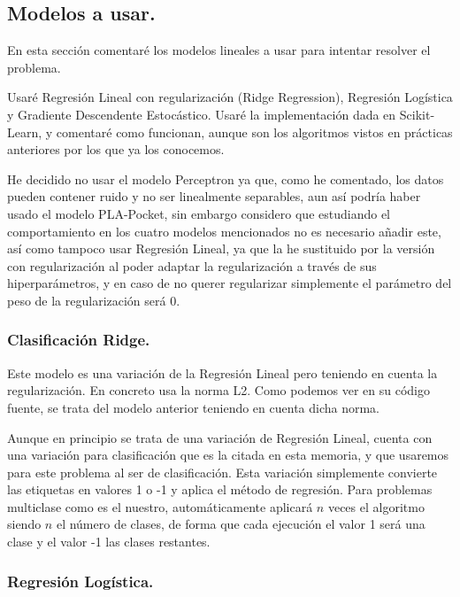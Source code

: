 \documentclass[12pt, spanish]{article}
\begin{document}
\newpage

\subsection{Modelos a usar.}

En esta sección comentaré los modelos lineales a usar para intentar resolver el problema.

Usaré Regresión Lineal con regularización (Ridge Regression), Regresión Logística y Gradiente Descendente Estocástico. Usaré la implementación dada en Scikit-Learn\cite{scikitlearnlinearmodels}, y comentaré como funcionan, aunque son los algoritmos vistos en prácticas anteriores por los que ya los conocemos.

He decidido no usar el modelo Perceptron ya que, como he comentado, los datos pueden contener ruido y no ser linealmente separables, aun así podría haber usado el modelo PLA-Pocket, sin embargo considero que estudiando el comportamiento en los cuatro modelos mencionados no es necesario añadir este, así como tampoco usar Regresión Lineal, ya que la he sustituido por la versión con regularización al poder adaptar la regularización a través de sus hiperparámetros, y en caso de no querer regularizar simplemente el parámetro del peso de la regularización será 0.


\subsubsection{Clasificación Ridge.}

Este modelo es una variación de la Regresión Lineal pero teniendo en cuenta la regularización. En concreto usa la norma L2. Como podemos ver en su código fuente\cite{sourceRidge}, se trata del modelo anterior teniendo en cuenta dicha norma.

Aunque en principio se trata de una variación de Regresión Lineal, cuenta con una variación para clasificación que es la citada en esta memoria, y que usaremos para este problema al ser de clasificación. Esta variación simplemente convierte las etiquetas en valores 1 o -1 y aplica el método de regresión. Para problemas multiclase como es el nuestro, automáticamente  aplicará $n$ veces el algoritmo siendo $n$ el número de clases, de forma que cada ejecución el valor 1 será una clase y el valor -1 las clases restantes.


\subsubsection{Regresión Logística.}
\end{document}
